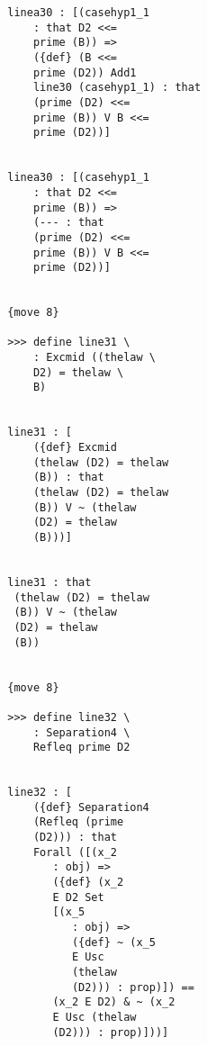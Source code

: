 \documentclass[12pt]{article}
\begin{document}
\begin{verbatim}
                           linea30 : [(casehyp1_1 
                               : that D2 <<= 
                               prime (B)) => 
                               ({def} (B <<= 
                               prime (D2)) Add1 
                               line30 (casehyp1_1) : that 
                               (prime (D2) <<= 
                               prime (B)) V B <<= 
                               prime (D2))]


                           linea30 : [(casehyp1_1 
                               : that D2 <<= 
                               prime (B)) => 
                               (--- : that 
                               (prime (D2) <<= 
                               prime (B)) V B <<= 
                               prime (D2))]


                           {move 8}

                           >>> define line31 \
                               : Excmid ((thelaw \
                               D2) = thelaw \
                               B)


                           line31 : [
                               ({def} Excmid 
                               (thelaw (D2) = thelaw 
                               (B)) : that 
                               (thelaw (D2) = thelaw 
                               (B)) V ~ (thelaw 
                               (D2) = thelaw 
                               (B)))]


                           line31 : that 
                            (thelaw (D2) = thelaw 
                            (B)) V ~ (thelaw 
                            (D2) = thelaw 
                            (B))


                           {move 8}

                           >>> define line32 \
                               : Separation4 \
                               Refleq prime D2


                           line32 : [
                               ({def} Separation4 
                               (Refleq (prime 
                               (D2))) : that 
                               Forall ([(x_2 
                                  : obj) => 
                                  ({def} (x_2 
                                  E D2 Set 
                                  [(x_5 
                                     : obj) => 
                                     ({def} ~ (x_5 
                                     E Usc 
                                     (thelaw 
                                     (D2))) : prop)]) == 
                                  (x_2 E D2) & ~ (x_2 
                                  E Usc (thelaw 
                                  (D2))) : prop)]))]



\end{verbatim}
\end{document}
